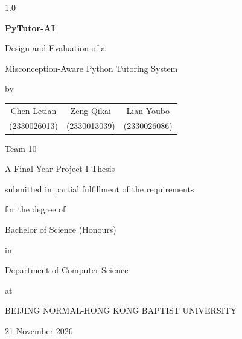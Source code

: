 
\begin{titlepage}
\thispagestyle{empty}
\begin{spacing}{1.0}
\centering
\vspace*{12mm}

{\LARGE\bfseries PyTutor-AI\par}
\vspace{5mm}
{\Large Design and Evaluation of a\par}
{\Large Misconception-Aware Python Tutoring System\par}

\vspace{14mm}
{\large by\par}
\vspace{8mm}
{\large
\begin{tabular}{ccc}
Chen Letian & Zeng Qikai & Lian Youbo\\[2mm]
(2330026013) & (2330013039) & (2330026086)
\end{tabular}\par}

\vspace{4mm}
{\large Team 10\par}

\vspace{16mm}
{\large A Final Year Project-I Thesis\par}
\vspace{3mm}
{\large submitted in partial fulfillment of the requirements\par}
{\large for the degree of\par}
\vspace{3mm}
{\large Bachelor of Science (Honours)\par}
\vspace{3mm}
{\large in\par}
\vspace{3mm}
{\large Department of Computer Science\par}
\vspace{3mm}
{\large at\par}
\vspace{3mm}
{\large BEIJING NORMAL-HONG KONG BAPTIST UNIVERSITY\par}

\vfill
{\large 21 November 2026\par}
\vspace{6mm}
\end{spacing}
\end{titlepage}

